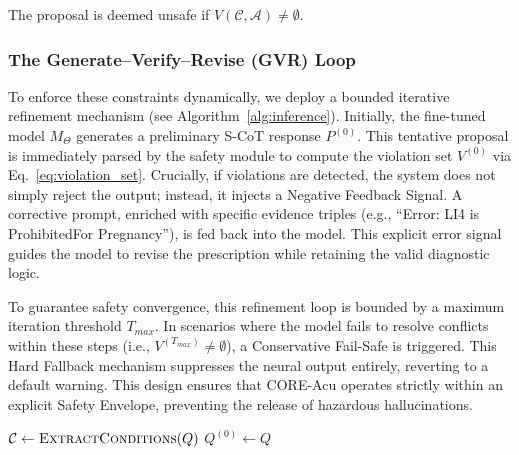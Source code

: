 \documentclass[preprint,5p,times,twocolumn,fleqn]{elsarticle}
\begin{document}
The proposal is deemed unsafe if $V(\mathcal{C}, \mathcal{A}) \neq \emptyset$.

\subsubsection{The Generate--Verify--Revise (GVR) Loop}
To enforce these constraints dynamically, we deploy a bounded iterative refinement mechanism (see Algorithm~\ref{alg:inference}). Initially, the fine-tuned model $M_\Theta$ generates a preliminary S-CoT response $P^{(0)}$. This tentative proposal is immediately parsed by the safety module to compute the violation set $V^{(0)}$ via Eq.~\eqref{eq:violation_set}. Crucially, if violations are detected, the system does not simply reject the output; instead, it injects a Negative Feedback Signal. A corrective prompt, enriched with specific evidence triples (e.g., ``Error: LI4 is ProhibitedFor Pregnancy''), is fed back into the model. This explicit error signal guides the model to revise the prescription while retaining the valid diagnostic logic.

To guarantee safety convergence, this refinement loop is bounded by a maximum iteration threshold $T_{max}$. In scenarios where the model fails to resolve conflicts within these steps (i.e., $V^{(T_{max})} \neq \emptyset$), a Conservative Fail-Safe is triggered. This Hard Fallback mechanism suppresses the neural output entirely, reverting to a default warning. This design ensures that CORE-Acu operates strictly within an explicit Safety Envelope, preventing the release of hazardous hallucinations.

\begin{algorithm}[t]
  \caption{Closed-Loop Inference with Symbolic Veto}
  \label{alg:inference}
  \DontPrintSemicolon
  \SetAlgoLined


  $\mathcal{C} \leftarrow \textsc{ExtractConditions}(Q)$ 
  $Q^{(0)} \leftarrow Q$\;

  \;
\end{algorithm}
\end{document}
